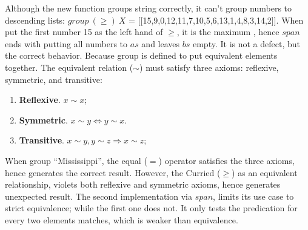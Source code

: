 \documentclass[b5paper]{article}
\begin{document}
Although the new function groups string correctly, it can't group numbers to descending lists: $\textit{group}\ (\geq)\ X$ = [[15,9,0,12,11,7,10,5,6,13,1,4,8,3,14,2]]. When put the first number 15 as the left hand of $\geq$, it is the maximum , hence $span$ ends with putting all numbers to $as$ and leaves $bs$ empty. It is not a defect, but the correct behavior. Because group is defined to put equivalent elements together. The equivalent relation ($\sim$) must satisfy three axioms: reflexive, symmetric, and transitive:

\begin{enumerate}
\item \textbf{Reflexive}. $x \sim x$;
\item \textbf{Symmetric}. $x \sim y \Leftrightarrow y \sim x$.
\item \textbf{Transitive}. $x \sim y, y \sim z \Rightarrow x \sim z$;
\end{enumerate}

When group ``Mississippi'', the equal ($=$) operator satisfies the three axioms, hence generates the correct result. However, the Curried ($\geq$) as an equivalent relationship, violets both reflexive and symmetric axioms, hence generates unexpected result. The second implementation via $span$, limits its use case to strict equivalence; while the first one does not. It only tests the predication for every two elements matches, which is weaker than equivalence.

\begin{Exercise}[label={ex:list-take-drop}]
\end{Exercise}
\end{document}
